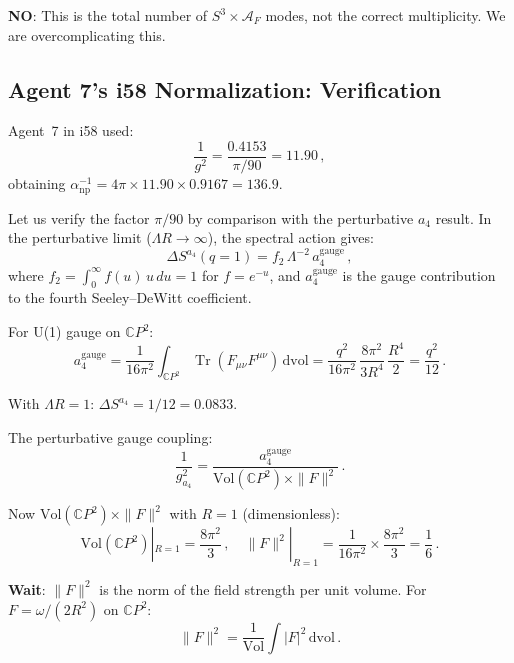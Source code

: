 \documentclass[11pt,a4paper]{article}
\newcommand{\Tr}{\operatorname{Tr}}
\newcommand{\CP}{\mathbb{C}P}
\begin{document}
\textbf{NO}: This is the total number of $S^3 \times \mathcal{A}_F$ modes, not the correct multiplicity. We are overcomplicating this.

\subsection{Agent 7's i58 Normalization: Verification}

Agent~7 in i58 used:
\begin{equation}
\frac{1}{g^2} = \frac{0.4153}{\pi/90} = 11.90\,,
\end{equation}
obtaining $\alpha^{-1}_{\mathrm{np}} = 4\pi \times 11.90 \times 0.9167 = 136.9$.

Let us verify the factor $\pi/90$ by comparison with the perturbative $a_4$ result. In the perturbative limit ($\Lambda R \to \infty$), the spectral action gives:
\begin{equation}
\Delta S^{a_4}(q=1) = f_2\,\Lambda^{-2}\,a_4^{\mathrm{gauge}}\,,
\end{equation}
where $f_2 = \int_0^\infty f(u)\,u\,du = 1$ for $f = e^{-u}$, and $a_4^{\mathrm{gauge}}$ is the gauge contribution to the fourth Seeley--DeWitt coefficient.

For U(1) gauge on $\CP^2$:
\begin{equation}
a_4^{\mathrm{gauge}} = \frac{1}{16\pi^2}\int_{\CP^2}\Tr(F_{\mu\nu}F^{\mu\nu})\,\mathrm{dvol} = \frac{q^2}{16\pi^2}\,\frac{8\pi^2}{3R^4}\,\frac{R^4}{2} = \frac{q^2}{12}\,.
\end{equation}

With $\Lambda R = 1$: $\Delta S^{a_4} = 1/12 = 0.0833$.

The perturbative gauge coupling:
\begin{equation}
\frac{1}{g^2_{a_4}} = \frac{a_4^{\mathrm{gauge}}}{\mathrm{Vol}(\CP^2) \times \|F\|^2}\,.
\end{equation}

Now $\mathrm{Vol}(\CP^2) \times \|F\|^2$ with $R = 1$ (dimensionless):
\begin{equation}
\mathrm{Vol}(\CP^2)|_{R=1} = \frac{8\pi^2}{3}\,,\quad \|F\|^2|_{R=1} = \frac{1}{16\pi^2} \times \frac{8\pi^2}{3} = \frac{1}{6}\,.
\end{equation}

\textbf{Wait}: $\|F\|^2$ is the norm of the field strength per unit volume. For $F = \omega/(2R^2)$ on $\CP^2$:
\begin{equation}
\|F\|^2 = \frac{1}{\mathrm{Vol}}\int |F|^2\,\mathrm{dvol}\,.
\end{equation}
\end{document}

